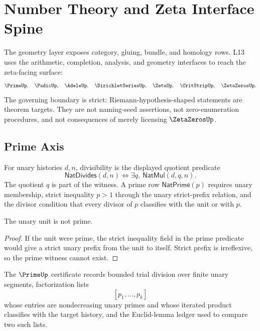 \chapter{Number Theory and Zeta Interface Spine}
\label{ch:visions-number-theory-spectra-spine}

The geometry layer exposes category, gluing, bundle, and homology rows.  L13
uses the arithmetic, completion, analysis, and geometry interfaces to reach the
zeta-facing surface:
$$
\PrimeUp,\quad
\PadicUp,\quad
\AdeleUp,\quad
\DirichletSeriesUp,\quad
\ZetaUp,\quad
\CritStripUp,\quad
\ZetaZerosUp.
$$
The governing boundary is strict: Riemann-hypothesis-shaped statements are
theorem targets.  They are not naming-seed assertions, not zero-enumeration
procedures, and not consequences of merely licensing $\ZetaZerosUp$.

\section{Prime Axis}
\label{sec:number-theory-spine-prime}

\begin{definition}
\label{def:number-theory-spine-prime}
For unary histories $d,n$, divisibility is the displayed quotient predicate
$$
\mathsf{NatDivides}(d,n)
\Longleftrightarrow
\exists q,\ \mathsf{NatMul}(d,q,n).
$$
The quotient $q$ is part of the witness.  A prime row $\mathsf{NatPrime}(p)$
requires unary membership, strict inequality $p>1$ through the unary
strict-prefix relation, and the divisor condition that every divisor of $p$
classifies with the unit or with $p$.
\end{definition}

\begin{theorem}
\label{thm:number-theory-spine-unit-not-prime}
The unary unit is not prime.
\end{theorem}

\begin{proof}
If the unit were prime, the strict inequality field in the prime predicate
would give a strict unary prefix from the unit to itself.  Strict prefix is
irreflexive, so the prime witness cannot exist.
\end{proof}

\begin{definition}
\label{def:number-theory-spine-factorization-ledger}
The $\PrimeUp$ certificate records bounded trial division over finite unary
segments, factorization lists
$$
[p_1,\ldots,p_k]
$$
whose entries are nondecreasing unary primes and whose iterated product
classifies with the target history, and the Euclid-lemma ledger used to
compare two such lists.
\end{definition}

